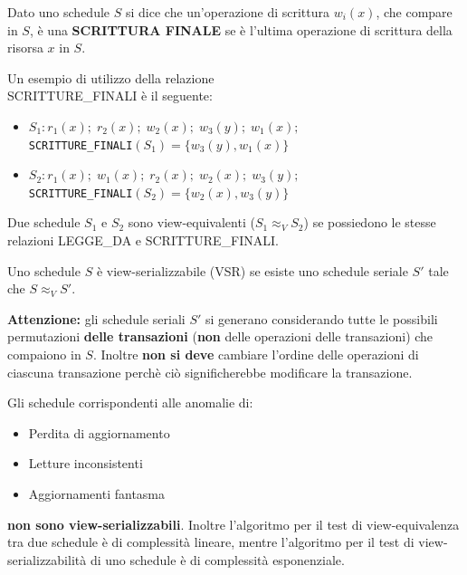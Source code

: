 \documentclass[a4paper]{article}
\begin{document}
{
  Dato uno schedule \( S \) si dice che un'operazione di scrittura \( w_i(x) \), che
  compare in \( S \), è una \textbf{SCRITTURA FINALE} se è l'ultima operazione di
  scrittura della risorsa \( x \) in \( S \).

  \begin{Example}{}{}
    Un esempio di utilizzo della relazione \\ SCRITTURE\_FINALI è il seguente:
    \begin{itemize}
      \item \( S_1: r_1(x);\; r_2(x);\; w_2(x);\; w_3(y);\; w_1(x); \) \\
        \texttt{SCRITTURE\_FINALI}\( (S_1) = \{ w_3(y), w_1(x) \} \)

      \item \( S_2: r_1(x);\; w_1(x);\; r_2(x);\; w_2(x);\; w_3(y); \) \\
        \texttt{SCRITTURE\_FINALI}\( (S_2) = \{ w_2(x), w_3(y) \} \)
    \end{itemize}
  \end{Example}
}

{
  Due schedule \( S_1 \) e \( S_2 \) sono view-equivalenti (\( S_1 \approx_V S_2 \))
  se possiedono le stesse relazioni LEGGE\_DA e SCRITTURE\_FINALI.
}

{
  Uno schedule \( S \) è view-serializzabile (VSR) se esiste uno schedule seriale \( S' \)
  tale che \( S \approx_V S' \).

  \vspace{1em}
  \noindent
  \textbf{Attenzione:} gli schedule seriali \( S' \) si generano considerando tutte le
  possibili permutazioni \textbf{delle transazioni} (\textbf{non} delle operazioni
  delle transazioni) che compaiono in \( S \). Inoltre \textbf{non
  si deve} cambiare l'ordine delle operazioni di ciascuna transazione perchè ciò
  significherebbe modificare la transazione.
}

\noindent
Gli schedule corrispondenti alle anomalie di:
\begin{itemize}
  \item Perdita di aggiornamento
  \item Letture inconsistenti
  \item Aggiornamenti fantasma
\end{itemize}
\textbf{non sono view-serializzabili}. Inoltre l'algoritmo per il test di view-equivalenza
tra due schedule è di complessità lineare, mentre l'algoritmo per il test di
view-serializzabilità di uno schedule è di complessità esponenziale.
\end{document}

